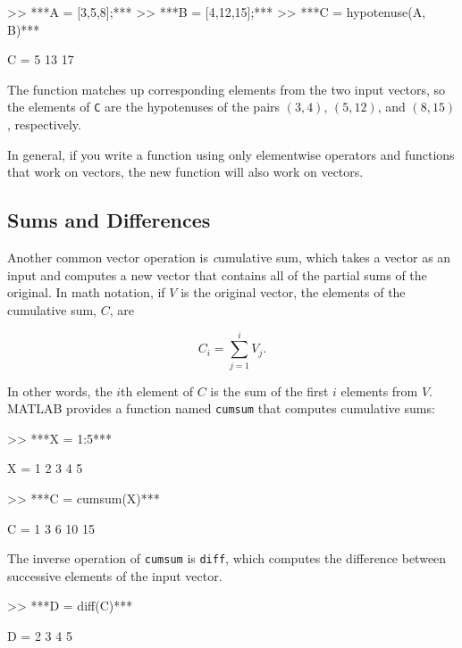 
\begin{code}
>> ***A = [3,5,8];***
>> ***B = [4,12,15];***
>> ***C = hypotenuse(A, B)***

C = 5    13    17
\end{code}

The function matches up corresponding elements from the two
input vectors, so the elements of \lstinline{C} are the hypotenuses of
the pairs $(3,4)$, $(5,12)$, and $(8,15)$, respectively.

In general, if you write a function using only elementwise
operators and functions that work on vectors, the new
function will also work on vectors.


\subsection{Sums and Differences}

Another common vector operation is {\emph cumulative sum}, which takes a vector as an input and computes a new vector that contains all of the partial sums of the original.  In math notation, if $V$ is the original vector, the elements of the cumulative sum, $C$, are


\begin{equation*}
C_i = \sum_{j=1}^i V_j.
\end{equation*}

In other words, the $i$th element of $C$ is the sum of the first
$i$ elements from $V$.  MATLAB provides a function named \lstinline{cumsum} that computes cumulative sums:


\begin{code}
>> ***X = 1:5***

X = 1     2     3     4     5

>> ***C = cumsum(X)***

C = 1     3     6    10    15
\end{code}

The inverse operation of \lstinline{cumsum} is \lstinline{diff}, which computes
the difference between successive elements of the input vector.


\begin{code}
>> ***D = diff(C)***

D = 2     3     4     5
\end{code}

